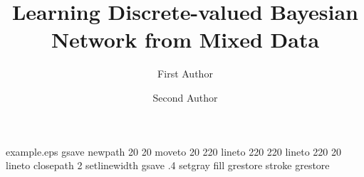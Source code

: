 %
%
%
%
%
\begin{filecontents*}{example.eps}
gsave
newpath
  20 20 moveto
  20 220 lineto
  220 220 lineto
  220 20 lineto
closepath
2 setlinewidth
gsave
  .4 setgray fill
grestore
stroke
grestore
\end{filecontents*}
%
\RequirePackage{fix-cm}
%
\documentclass[smallextended]{svjour3}       %
%
\smartqed  %
%
\usepackage{amsmath}
\usepackage{graphicx} %
\usepackage{algorithm}
\usepackage{algpseudocode}
\usepackage[round]{natbib}
%
%
%
%
%


\title{Learning Discrete-valued Bayesian Network from Mixed Data%
}


\author{First Author         \and
        Second Author %
}

